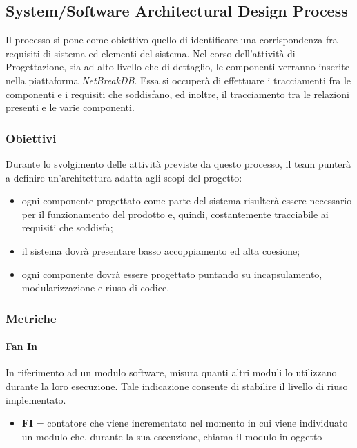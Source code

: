 	\subsection{System/Software Architectural Design Process}
	Il processo si pone come obiettivo quello di identificare una corrispondenza fra requisiti di sistema ed elementi del sistema. Nel corso dell’attività di Progettazione, sia ad alto livello che di dettaglio, le componenti verranno inserite nella piattaforma \textit{NetBreakDB}. Essa si occuperà di effettuare i tracciamenti fra le componenti e i requisiti che soddisfano, ed inoltre, il tracciamento tra le relazioni presenti e le varie componenti.
		
		\subsubsection{Obiettivi}
		Durante lo svolgimento delle attività previste da questo processo, il team punterà a definire
		un’architettura adatta agli scopi del progetto:
		\begin{itemize}
			\item ogni componente progettato come parte del sistema risulterà essere necessario per il funzionamento del prodotto e, quindi, costantemente tracciabile ai requisiti che soddisfa;
			\item il sistema dovrà presentare basso accoppiamento ed alta coesione;
			\item ogni componente dovrà essere progettato puntando su incapsulamento, modularizzazione
			e riuso di codice.
		\end{itemize}
		
		\subsubsection{Metriche}
			\paragraph{Fan In}
			In riferimento ad un modulo software, misura quanti altri moduli lo utilizzano durante la loro esecuzione.
			Tale indicazione consente di stabilire il livello di riuso implementato.
			
			\begin{itemize}
				\item \textbf{FI} = contatore che viene incrementato nel momento in cui viene individuato un modulo che, durante la sua esecuzione, chiama il modulo in oggetto
			\end{itemize}
			
